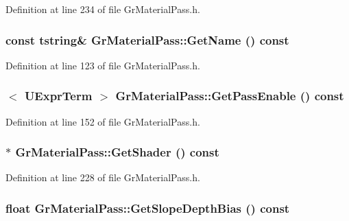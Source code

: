 Definition at line 234 of file GrMaterialPass.h.\hypertarget{class_gr_material_pass_dc8d850ec17437ac3000c63a00205476}{
\subsubsection[{GetName}]{\setlength{\rightskip}{0pt plus 5cm}const {\bf tstring}\& GrMaterialPass::GetName () const}}
\label{class_gr_material_pass_dc8d850ec17437ac3000c63a00205476}




Definition at line 123 of file GrMaterialPass.h.\hypertarget{class_gr_material_pass_a23b06c046521ef6912665969576500c}{
\subsubsection[{GetPassEnable}]{$<$ {\bf UExprTerm} $>$ GrMaterialPass::GetPassEnable () const}}
\label{class_gr_material_pass_a23b06c046521ef6912665969576500c}




Definition at line 152 of file GrMaterialPass.h.\hypertarget{class_gr_material_pass_c03a1be09b50c814be01d535c64c4da3}{
\subsubsection[{GetShader}]{$\ast$ GrMaterialPass::GetShader () const}}
\label{class_gr_material_pass_c03a1be09b50c814be01d535c64c4da3}




Definition at line 228 of file GrMaterialPass.h.\hypertarget{class_gr_material_pass_5d7fb2c310bd6996474166d2b04f6e61}{
\subsubsection[{GetSlopeDepthBias}]{\setlength{\rightskip}{0pt plus 5cm}float GrMaterialPass::GetSlopeDepthBias () const}}
\label{class_gr_material_pass_5d7fb2c310bd6996474166d2b04f6e61}




